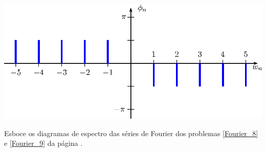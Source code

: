 \begin{resp}
\begin{itemize}
\includegraphics{cap_diagramas_espectro/pics/figura_20}

\end{itemize}
\end{resp}
\begin{exer}Esboce os diagramas de espectro das séries de Fourier dos problemas \ref{Fourier_8} e \ref{Fourier_9} da página \pageref{Fourier_8}.
\end{exer}
